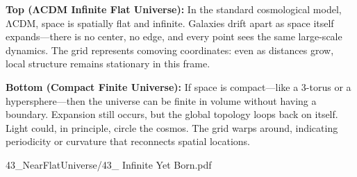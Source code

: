 \begin{SideNotePage}{
  \textbf{Top (ΛCDM Infinite Flat Universe):}  
  In the standard cosmological model, ΛCDM, space is spatially flat and infinite. Galaxies drift apart as space itself expands—there is no center, no edge, and every point sees the same large-scale dynamics. The grid represents comoving coordinates: even as distances grow, local structure remains stationary in this frame. \par

  \textbf{Bottom (Compact Finite Universe):}  
  If space is compact—like a 3-torus or a hypersphere—then the universe can be finite in volume without having a boundary. Expansion still occurs, but the global topology loops back on itself. Light could, in principle, circle the cosmos. The grid warps around, indicating periodicity or curvature that reconnects spatial locations. \par
}{43_NearFlatUniverse/43_ Infinite Yet Born.pdf}
\end{SideNotePage}
